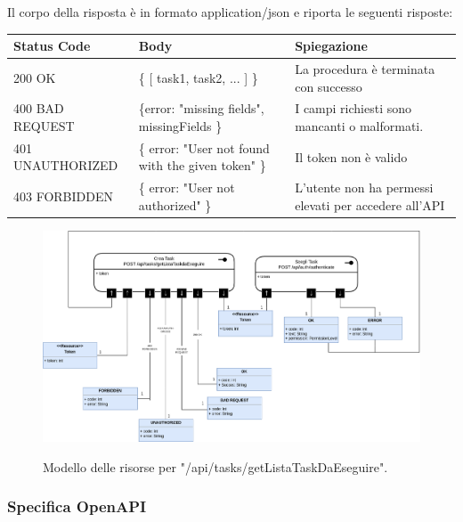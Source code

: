 \documentclass{report}
\begin{document}
Il corpo della risposta è in formato application/json e riporta le seguenti risposte:

\begin{center} %
	\centering
	\begin{tabular}{ |p{4cm}|p{4cm}|p{4cm}| }
		\hline
		\centering Status Code & \qquad\qquad\quad Body & \qquad\quad Spiegazione\\ %
		\hline
		200 OK & \{ [ task1, task2, ... ] \}  & La procedura è terminata con successo	\\ 
		\hline
		400 BAD REQUEST & \{error: "missing fields", missingFields \} & I campi richiesti sono mancanti o malformati. \\
		\hline
		401 UNAUTHORIZED & \{ error: "User not found with the given token" \} & Il token non è valido \\
		\hline
		403 FORBIDDEN & \{ error: "User not authorized" \} &  L'utente non ha permessi elevati per accedere all'API \\
		\hline
	\end{tabular}
\end{center}

\begin{figure}[H]
	\centering\includegraphics[width=1\textwidth]{images/model_da_eseguire.png}
	
	Modello delle risorse per "/api/tasks/getListaTaskDaEseguire".
\end{figure}

\subsubsection*{Specifica OpenAPI}
\end{document}
